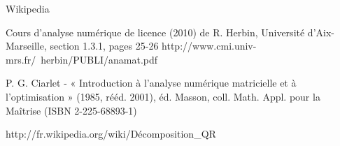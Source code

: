 \begin{thebibliography}{9}
  Wikipedia%

  Cours d'analyse numérique de licence (2010) de R. Herbin, Université d'Aix-Marseille, section 1.3.1, pages 25-26
  http://www.cmi.univ-mrs.fr/~herbin/PUBLI/anamat.pdf
  
  P. G. Ciarlet - « Introduction à l'analyse numérique matricielle et à l'optimisation » (1985, rééd. 2001), éd. Masson, coll. Math. Appl. pour la Maîtrise (ISBN 2-225-68893-1)

  http://fr.wikipedia.org/wiki/Décomposition_QR
  

  

\end{thebibliography}
